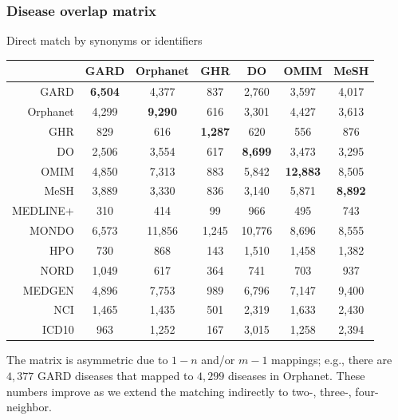 ﻿\documentclass[anchorcolor=blue,linkcolor=blue]{beamer}
\begin{document}
\begin{frame}
  \frametitle{Disease overlap matrix}
  \begin{block}{Direct match by synonyms or identifiers}
    \begin{center}\tiny
      \begin{tabular}{rcccccc}\toprule
        & GARD & Orphanet & GHR & DO & OMIM & MeSH\\ \midrule
        GARD & \textbf{6,504}&4,377&837&2,760&3,597&4,017\\
        Orphanet &4,299&\textbf{9,290}&616&3,301&4,427&3,613\\
        GHR &829&616&\textbf{1,287}&620&556&876\\
        DO &2,506&3,554&617&\textbf{8,699}&3,473&3,295\\
        OMIM &4,850&7,313&883&5,842&\textbf{12,883}&8,505\\
        MeSH &3,889&3,330&836&3,140&5,871&\textbf{8,892}\\
        MEDLINE+ &310&414&99&966&495&743\\
        MONDO &6,573&11,856&1,245&10,776&8,696&8,555\\
        HPO &730&868&143&1,510&1,458&1,382\\
        NORD & 1,049 & 617 &364 &741 &703 &937 \\
        MEDGEN &4,896 &7,753 &989 &6,796 &7,147 &9,400 \\
        NCI & 1,465 &1,435 &501 &2,319 &1,633 &2,430 \\
        ICD10 & 963 & 1,252& 167& 3,015& 1,258&2,394\\ \bottomrule
      \end{tabular}
    \end{center}
    The matrix is asymmetric due to $1-n$ and/or $m-1$ mappings; e.g.,
    there are $4,377$ GARD diseases that mapped to $4,299$ diseases in
    Orphanet. These numbers improve as we extend the
    matching indirectly to two-, three-, four-neighbor.
  \end{block}
\end{frame}
\end{document}
